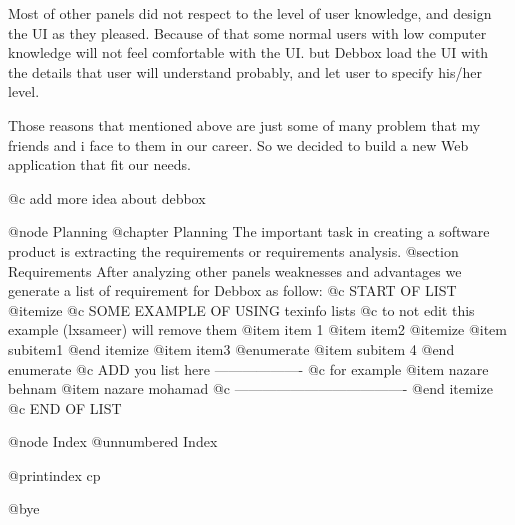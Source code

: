 Most of other panels did not respect to the level of user knowledge, and design the UI as they pleased. Because of that
some normal users with low computer knowledge will not feel comfortable with the UI. but Debbox load the UI with the details
 that user will understand probably, and let user to specify his/her level.

Those reasons that mentioned above are just some of many problem that my friends and i face to them in our career. So
we decided to build a new Web application that fit our needs.


@c add more idea about debbox       

@node Planning
@chapter Planning
The important task in creating a software product is extracting the requirements or requirements analysis. 
@section Requirements
After analyzing other panels weaknesses and advantages we generate a list of requirement for Debbox as follow:
@c START OF LIST
@itemize
@c SOME EXAMPLE OF USING texinfo lists
@c to not edit this example (lxsameer) will remove them
@item
item 1
@item
item2
@itemize
@item 
subitem1
@end itemize
@item
item3
@enumerate 
@item
subitem 4
@end enumerate
@c ADD you list here -------------------
@c for example
@item
nazare behnam
@item
nazare mohamad
@c -------------------------------------
@end itemize
@c END OF LIST

@node Index
@unnumbered Index

@printindex cp

@bye
